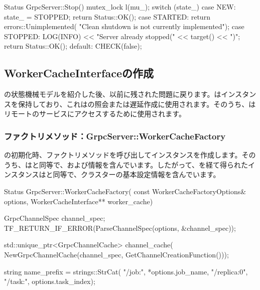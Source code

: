 \begin{content}
\begin{leftbar}
\begin{c++}
Status GrpcServer::Stop() {
  mutex_lock l(mu_);
  switch (state_) {
    case NEW:
      state_ = STOPPED;
      return Status::OK();
    case STARTED:
      return errors::Unimplemented(
          "Clean shutdown is not currently implemented");
    case STOPPED:
      LOG(INFO) << "Server already stopped(" << target() << ")";
      return Status::OK();
    default:
      CHECK(false);
  }
}
\end{c++}
\end{leftbar}

\subsection{WorkerCacheInterfaceの作成}

の状態機械モデルを紹介した後、以前に残された問題に戻ります。はインスタンスを保持しており、これはの照会または遅延作成に使用されます。そのうち、はリモートのサービスにアクセスするために使用されます。

\subsubsection{ファクトリメソッド：GrpcServer::WorkerCacheFactory}

の初期化時、ファクトリメソッドを呼び出してインスタンスを作成します。そのうち、はと同等で、および情報を含んでいます。したがって、を経て得られたインスタンスはと同等で、クラスターの基本設定情報を含んでいます。

\begin{leftbar}
\begin{c++}
Status GrpcServer::WorkerCacheFactory(
    const WorkerCacheFactoryOptions& options,
    WorkerCacheInterface** worker_cache) {

  GrpcChannelSpec channel_spec;
  TF_RETURN_IF_ERROR(ParseChannelSpec(options, &channel_spec));

  std::unique_ptr<GrpcChannelCache> channel_cache(
      NewGrpcChannelCache(channel_spec, GetChannelCreationFunction()));

  string name_prefix = strings::StrCat(
      "/job:", *options.job_name, "/replica:0",
      "/task:", options.task_index);

}
\end{c++}
\end{leftbar}
\end{content}
